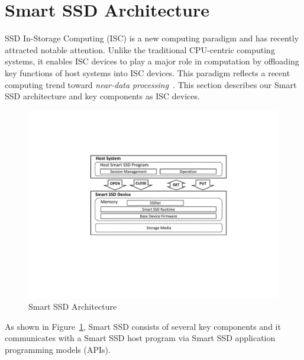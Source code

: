 
\section{Smart SSD Architecture}\label{sec:ssdArch}


SSD In-Storage Computing (ISC) is a new computing paradigm and has recently attracted notable attention. Unlike the traditional CPU-centric computing systems, it enables ISC devices to play a major role in computation by offloading key functions of host systems into ISC devices. This paradigm reflects a recent computing trend toward \emph{near-data processing}~\cite{Balasubramonian14}. This section describes our Smart SSD architecture and key components as ISC devices.

\begin{figure}[htbp]
	\centering
		\includegraphics[width=0.95\columnwidth]{figures/SmartSSD_Architecture.pdf}
	\caption{\small Smart SSD Architecture}
	\label{fig:SmartSSD_arch}
\end{figure}

As shown in Figure~\ref{fig:SmartSSD_arch}, Smart SSD consists of several key components and it communicates with a Smart SSD host program via Smart SSD application programming models (APIs).


